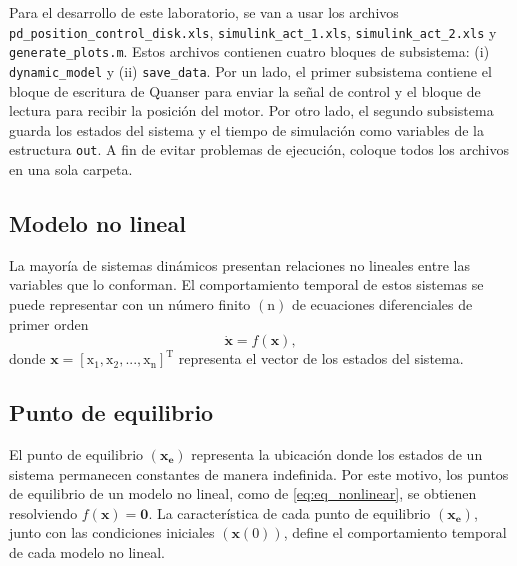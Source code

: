 	Para el desarrollo de este laboratorio, se van a usar los archivos \texttt{pd\_position\_control\_disk.xls}, \texttt{simulink\_act\_1.xls}, \texttt{simulink\_act\_2.xls} y \texttt{generate\_plots.m}. Estos archivos contienen cuatro bloques de subsistema: (i) \texttt{dynamic\_model} y (ii) \texttt{save\_data}. Por un lado, el primer subsistema contiene el bloque de escritura de Quanser para enviar la señal de control y el bloque de lectura para recibir la posición del motor.  Por otro lado, el segundo subsistema guarda los estados del sistema y el tiempo de simulación como variables de la estructura \texttt{out}. A fin de evitar problemas de ejecución, coloque todos los archivos en una sola carpeta.
	
	\subsection{Modelo no lineal}
	
	La mayoría de sistemas dinámicos presentan relaciones no lineales entre las variables que lo conforman. El comportamiento temporal de estos sistemas se puede representar con un número finito $(\mathrm{n})$ de ecuaciones diferenciales de primer orden
	\begin{equation}
		\mathbf{\dot{x}} = f(\mathbf{x}),
		\label{eq:eq_nonlinear}
	\end{equation}
	\noindent donde $\mathbf{x}=[\mathrm{x_1, x_2,..., x_n }]^\mathrm{T}$ representa el vector de los estados del sistema.
	
	\subsection{Punto de equilibrio}
	El punto de equilibrio $(\mathbf{x_e})$ representa la ubicación donde los estados de un sistema permanecen constantes de manera indefinida. Por este motivo, los puntos de equilibrio de un modelo no lineal, como de \eqref{eq:eq_nonlinear}, se obtienen resolviendo $f(\mathbf{x})=\mathbf{0}$. La característica de cada punto de equilibrio $(\mathbf{x_e})$, junto con las condiciones iniciales $(\mathbf{x}(0))$, define el comportamiento temporal de cada modelo no lineal.
	
	
